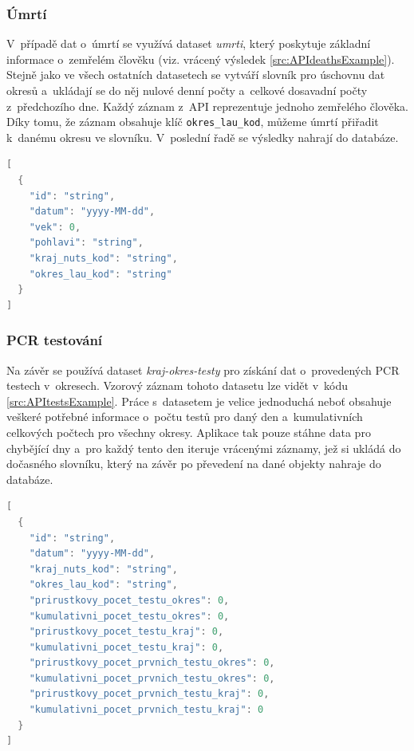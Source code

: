 \subsubsection*{Úmrtí}

V~případě dat o~úmrtí se využívá dataset \emph{umrti}, který poskytuje základní informace o~zemřelém člověku (viz. vrácený výsledek \ref{src:APIdeathsExample}). Stejně jako ve všech ostatních datasetech se vytváří slovník pro úschovnu dat okresů a~ukládají se do něj nulové denní počty a~celkové dosavadní počty z~předchozího dne. Každý záznam z~API reprezentuje jednoho zemřelého člověka. Díky tomu, že záznam obsahuje klíč \texttt{okres\_lau\_kod}, můžeme úmrtí přiřadit k~danému okresu ve slovníku. V~poslední řadě se výsledky nahrají do databáze.

\begin{lstlisting}[language=Java,label=src:APIdeathsExample,caption={Schéma vrácených dat z datasetu \emph{umrti} z API Onemocnění aktuálně}]
[
  {
    "id": "string",
    "datum": "yyyy-MM-dd",
    "vek": 0,
    "pohlavi": "string",
    "kraj_nuts_kod": "string",
    "okres_lau_kod": "string"
  }
]
\end{lstlisting}

\subsubsection*{PCR testování}

Na závěr se používá dataset \emph{kraj-okres-testy} pro získání dat o~provedených PCR testech v~okresech. Vzorový záznam tohoto datasetu lze vidět v~kódu \ref{src:APItestsExample}. Práce s~datasetem je velice jednoduchá neboť obsahuje veškeré potřebné informace o~počtu testů pro daný den a~kumulativních celkových počtech pro všechny okresy. Aplikace tak pouze stáhne data pro chybějící dny a~pro každý tento den iteruje vrácenými záznamy, jež si ukládá do dočasného slovníku, který na závěr po převedení na dané objekty nahraje do databáze.

\begin{lstlisting}[language=Java,label=src:APItestsExample,caption={Schéma vrácených dat z datasetu \emph{kraj-okres-testy} z API Onemocnění aktuálně}]
[
  {
    "id": "string",
    "datum": "yyyy-MM-dd",
    "kraj_nuts_kod": "string",
    "okres_lau_kod": "string",
    "prirustkovy_pocet_testu_okres": 0,
    "kumulativni_pocet_testu_okres": 0,
    "prirustkovy_pocet_testu_kraj": 0,
    "kumulativni_pocet_testu_kraj": 0,
    "prirustkovy_pocet_prvnich_testu_okres": 0,
    "kumulativni_pocet_prvnich_testu_okres": 0,
    "prirustkovy_pocet_prvnich_testu_kraj": 0,
    "kumulativni_pocet_prvnich_testu_kraj": 0
  }
]
\end{lstlisting}

